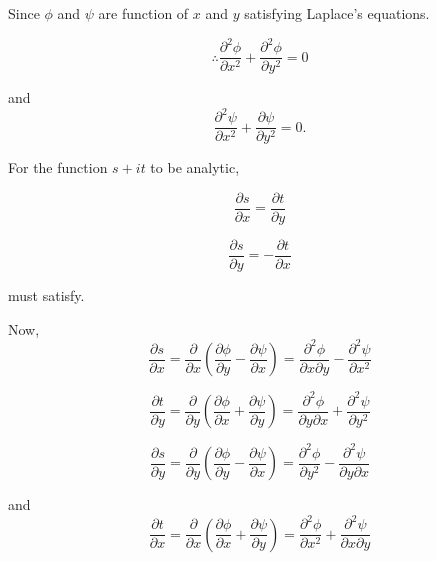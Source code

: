 \begin{solution}

Since $\phi$ and $\psi$ are function of $x$ and $y$ satisfying Laplace's
equations.

\begin{equation}
\therefore\frac{\partial^{2}\phi}{\partial x^{2}}+\frac{\partial^{2}\phi}{\partial y^{2}}=0\label{eq:ex1}\end{equation}


and \begin{equation}
\frac{\partial^{2}\psi}{\partial x^{2}}+\frac{\partial\psi}{\partial y^{2}}=0.\label{eq:ex2}\end{equation}


For the function $s+it$ to be analytic,

\begin{equation}
\frac{\partial s}{\partial x}=\frac{\partial t}{\partial y}\label{eq:ex3}\end{equation}


\begin{equation}
\frac{\partial s}{\partial y}=-\frac{\partial t}{\partial x}\label{eq:ex4}\end{equation}


must satisfy.

Now, \begin{equation}
\frac{\partial s}{\partial x}=\frac{\partial}{\partial x}\left(\frac{\partial\phi}{\partial y}-\frac{\partial\psi}{\partial x}\right)=\frac{\partial^{2}\phi}{\partial x\partial y}-\frac{\partial^{2}\psi}{\partial x^{2}}\label{eq:ex5}\end{equation}


\begin{equation}
\frac{\partial t}{\partial y}=\frac{\partial}{\partial y}\left(\frac{\partial\phi}{\partial x}+\frac{\partial\psi}{\partial y}\right)=\frac{\partial^{2}\phi}{\partial y\partial x}+\frac{\partial^{2}\psi}{\partial y^{2}}\label{eq:ex6}\end{equation}


\begin{equation}
\frac{\partial s}{\partial y}=\frac{\partial}{\partial y}\left(\frac{\partial\phi}{\partial y}-\frac{\partial\psi}{\partial x}\right)=\frac{\partial^{2}\phi}{\partial y^{2}}-\frac{\partial^{2}\psi}{\partial y\partial x}\label{eq:ex7}\end{equation}


and \begin{equation}
\frac{\partial t}{\partial x}=\frac{\partial}{\partial x}\left(\frac{\partial\phi}{\partial x}+\frac{\partial\psi}{\partial y}\right)=\frac{\partial^{2}\phi}{\partial x^{2}}+\frac{\partial^{2}\psi}{\partial x\partial y}\label{eq:ex8}\end{equation}



\end{solution}
